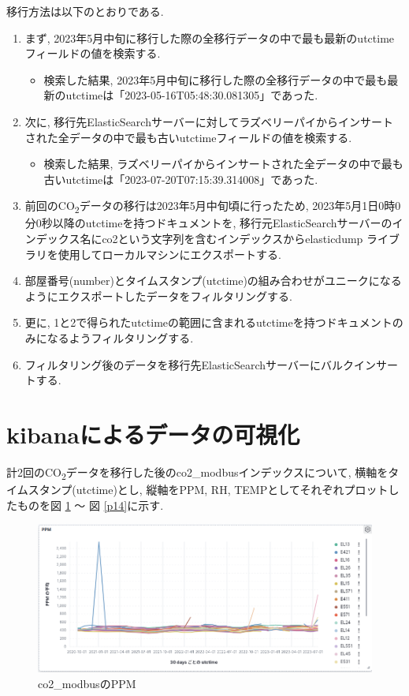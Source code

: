 移行方法は以下のとおりである.

\begin{enumerate}
  \item まず, 2023年5月中旬に移行した際の全移行データの中で最も最新のutctimeフィールドの値を検索する.
        \begin{itemize}
          \item 検索した結果, 2023年5月中旬に移行した際の全移行データの中で最も最新のutctimeは「2023-05-16T05:48:30.081305」であった.
        \end{itemize}
  \item 次に, 移行先ElasticSearchサーバーに対してラズベリーパイからインサートされた全データの中で最も古いutctimeフィールドの値を検索する.
        \begin{itemize}
          \item 検索した結果, ラズベリーパイからインサートされた全データの中で最も古いutctimeは「2023-07-20T07:15:39.314008」であった.
        \end{itemize}
  \item 前回のCO\textsubscript{2}データの移行は2023年5月中旬頃に行ったため, 2023年5月1日0時0分0秒以降のutctimeを持つドキュメントを, 移行元ElasticSearchサーバーのインデックス名にco2という文字列を含むインデックスからelasticdump \cite{1}ライブラリを使用してローカルマシンにエクスポートする.
  \item 部屋番号(number)とタイムスタンプ(utctime)の組み合わせがユニークになるようにエクスポートしたデータをフィルタリングする.
  \item 更に, 1と2で得られたutctimeの範囲に含まれるutctimeを持つドキュメントのみになるようフィルタリングする.
  \item フィルタリング後のデータを移行先ElasticSearchサーバーにバルクインサートする.
\end{enumerate}

\section{kibanaによるデータの可視化}

計2回のCO\textsubscript{2}データを移行した後のco2\_modbusインデックスについて, 横軸をタイムスタンプ(utctime)とし, 縦軸をPPM, RH, TEMPとしてそれぞれプロットしたものを図 \ref{p12} 〜 図 \ref{p14}に示す.

\begin{figure}[h]
  \begin{center}
    \includegraphics[width=160mm]{sotu/figure/ppm.png}
    \caption{co2\_modbusのPPM}
    \label{p12}
  \end{center}
\end{figure}

